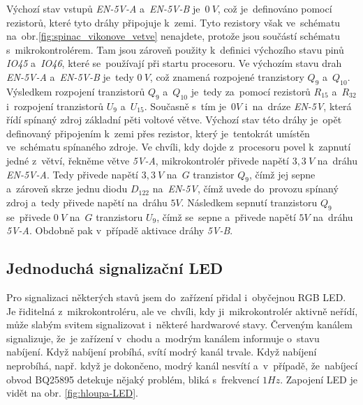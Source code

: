 Výchozí stav vstupů {\itshape EN-5V-A} a~{\itshape  EN-5V-B} je~\(0~V\), což je~definováno pomocí rezistorů, které tyto dráhy připojuje k~zemi.
Tyto rezistory však ve~schématu na~obr.\ref{fig:spinac_vikonove_vetve} nenajdete, protože jsou součástí schématu s~mikrokontrolérem.
Tam jsou zároveň použity k~definici výchozího stavu pinů {\it IO45} a~{\it IO46}, které se~používají při startu procesoru.
Ve výchozím stavu drah {\itshape EN-5V-A} a~{\itshape EN-5V-B} je~tedy \(0~V\), což znamená rozpojené tranzistory \(Q_9\) a~\(Q_{10}\).
Výsledkem rozpojení tranzistorů \(Q_9\) a~\(Q_{10}\) je~tedy za~pomocí rezistorů \(R_{15}\) a~\(R_{32}\) i~rozpojení tranzistorů \(U_{9}\) a~\(U_{15}\).
Současně s~tím je~\(0V\) i~na~dráze {\itshape EN-5V}, která řídí spínaný zdroj základní pěti voltové větve.
Výchozí stav této dráhy je~opět definovaný připojením k~zemi přes rezistor, který je~tentokrát umístěn ve~schématu spínaného zdroje.
Ve chvíli, kdy dojde z~procesoru povel k~zapnutí jedné z~větví, řekněme větve {\itshape 5V-A}, mikrokontrolér přivede napětí \(3,3~V\) na~dráhu {\itshape EN-5V-A}.
Tedy přivede napětí \(3,3~V\) na~\(G\) tranzistor \(Q_9\), čímž jej sepne a~zároveň skrze jednu diodu \(D_{122}\) na~{\itshape EN-5V}, čímž uvede do~provozu spínaný zdroj a~tedy přivede napětí na~dráhu \(5V\).
Následkem sepnutí tranzistoru \(Q_9\) se~přivede \(0~V\) na~\(G\) tranzistoru \(U_{9}\), čímž se~sepne a~přivede napětí \(5V\) na~dráhu {\itshape 5V-A}.
Obdobně pak v~případě aktivace dráhy {\itshape 5V-B}.


\subsection{Jednoduchá signalizační LED}

Pro signalizaci některých stavů jsem do~zařízení přidal i~obyčejnou RGB LED.
Je řiditelná z~mikrokontroléru, ale ve~chvíli, kdy ji~mikrokontrolér aktivně neřídí, může slabým svitem signalizovat i~některé hardwarové stavy.
Červeným kanálem signalizuje, že~je zařízení v~chodu a~modrým kanálem informuje o~stavu nabíjení.
Když nabíjení probíhá, svítí modrý kanál trvale.
Když nabíjení neprobíhá, např. když je dokončeno, modrý kanál nesvítí a~v~případě, že~nabíjecí obvod BQ25895 \cite{BQ25895} detekuje nějaký problém, bliká s~frekvencí \(1 Hz\).
Zapojení LED je vidět na obr. \ref{fig:hloupa-LED}.

